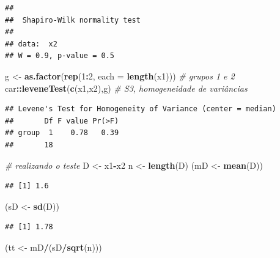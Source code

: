 \documentclass[
]{book}
\newenvironment{Shaded}{\begin{snugshade}}{\end{snugshade}}
\newcommand{\CommentTok}[1]{\textcolor[rgb]{0.56,0.35,0.01}{\textit{#1}}}
\newcommand{\DataTypeTok}[1]{\textcolor[rgb]{0.13,0.29,0.53}{#1}}
\newcommand{\DecValTok}[1]{\textcolor[rgb]{0.00,0.00,0.81}{#1}}
\newcommand{\KeywordTok}[1]{\textcolor[rgb]{0.13,0.29,0.53}{\textbf{#1}}}
\newcommand{\NormalTok}[1]{#1}
\newcommand{\OperatorTok}[1]{\textcolor[rgb]{0.81,0.36,0.00}{\textbf{#1}}}
\newcommand{\StringTok}[1]{\textcolor[rgb]{0.31,0.60,0.02}{#1}}
\theoremstyle{definition}
\theoremstyle{definition}
\theoremstyle{definition}
\theoremstyle{remark}
\begin{document}
\begin{verbatim}
## 
##  Shapiro-Wilk normality test
## 
## data:  x2
## W = 0.9, p-value = 0.5
\end{verbatim}

\begin{Shaded}
\begin{Highlighting}[]
\NormalTok{g \textless{}{-}}\StringTok{ }\KeywordTok{as.factor}\NormalTok{(}\KeywordTok{rep}\NormalTok{(}\DecValTok{1}\OperatorTok{:}\DecValTok{2}\NormalTok{, }\DataTypeTok{each =} \KeywordTok{length}\NormalTok{(x1))) }\CommentTok{\# grupos 1 e 2}
\NormalTok{car}\OperatorTok{::}\KeywordTok{leveneTest}\NormalTok{(}\KeywordTok{c}\NormalTok{(x1,x2),g) }\CommentTok{\# S3, homogeneidade de variâncias}
\end{Highlighting}
\end{Shaded}

\begin{verbatim}
## Levene's Test for Homogeneity of Variance (center = median)
##       Df F value Pr(>F)
## group  1    0.78   0.39
##       18
\end{verbatim}

\begin{Shaded}
\begin{Highlighting}[]
\CommentTok{\# realizando o teste}
\NormalTok{D \textless{}{-}}\StringTok{ }\NormalTok{x1}\OperatorTok{{-}}\NormalTok{x2}
\NormalTok{n \textless{}{-}}\StringTok{ }\KeywordTok{length}\NormalTok{(D)}
\NormalTok{(mD \textless{}{-}}\StringTok{ }\KeywordTok{mean}\NormalTok{(D))}
\end{Highlighting}
\end{Shaded}

\begin{verbatim}
## [1] 1.6
\end{verbatim}

\begin{Shaded}
\begin{Highlighting}[]
\NormalTok{(sD \textless{}{-}}\StringTok{ }\KeywordTok{sd}\NormalTok{(D))}
\end{Highlighting}
\end{Shaded}

\begin{verbatim}
## [1] 1.78
\end{verbatim}

\begin{Shaded}
\begin{Highlighting}[]
\NormalTok{(tt \textless{}{-}}\StringTok{ }\NormalTok{mD}\OperatorTok{/}\NormalTok{(sD}\OperatorTok{/}\KeywordTok{sqrt}\NormalTok{(n)))}
\end{Highlighting}
\end{Shaded}
\end{document}
